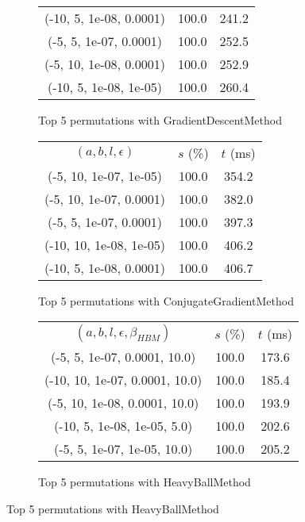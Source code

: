 \begin{figure}[H]
\begin{subfigure}[ht]{.5\textwidth}
\begin{tabular}{|c|c|c|}
(-10, 5, 1e-08, 0.0001) & 100.0 & 241.2 \\
(-5, 5, 1e-07, 0.0001) & 100.0 & 252.5 \\
(-5, 10, 1e-08, 0.0001) & 100.0 & 252.9 \\
(-10, 5, 1e-08, 1e-05) & 100.0 & 260.4 \\
\hline
\end{tabular}
\caption{Top 5 permutations with GradientDescentMethod}
\label{subfig:param_comp_MatrixSquareSum_GradientDescentMethod_DichotomousSearch}
\end{subfigure}
\hfill
\begin{subfigure}[ht]{.5\textwidth}
\begin{tabular}{|c|c|c|}
\hline
\rowcolor{gray!25}
\multicolumn{3}{|c|}{ConjugateGradientMethod} \\
\hline
\rowcolor{gray!25}
$(a,b,l,\epsilon)$ & $s$ (\%) & $t$ (ms) \\
\hline
(-5, 10, 1e-07, 1e-05) & 100.0 & 354.2 \\
(-5, 10, 1e-07, 0.0001) & 100.0 & 382.0 \\
(-5, 5, 1e-07, 0.0001) & 100.0 & 397.3 \\
(-10, 10, 1e-08, 1e-05) & 100.0 & 406.2 \\
(-10, 5, 1e-08, 0.0001) & 100.0 & 406.7 \\
\hline
\end{tabular}
\caption{Top 5 permutations with ConjugateGradientMethod}
\label{subfig:param_comp_MatrixSquareSum_ConjugateGradientMethod_DichotomousSearch}
\end{subfigure}
\hfill
\begin{subfigure}[ht]{.5\textwidth}
\begin{tabular}{|c|c|c|}
\hline
\rowcolor{gray!25}
\multicolumn{3}{|c|}{HeavyBallMethod} \\
\hline
\rowcolor{gray!25}
$(a,b,l,\epsilon,\beta_{HBM})$ & $s$ (\%) & $t$ (ms) \\
\hline
(-5, 5, 1e-07, 0.0001, 10.0) & 100.0 & 173.6 \\
(-10, 10, 1e-07, 0.0001, 10.0) & 100.0 & 185.4 \\
(-5, 10, 1e-08, 0.0001, 10.0) & 100.0 & 193.9 \\
(-10, 5, 1e-08, 1e-05, 5.0) & 100.0 & 202.6 \\
(-5, 5, 1e-07, 1e-05, 10.0) & 100.0 & 205.2 \\
\hline
\end{tabular}
\caption{Top 5 permutations with HeavyBallMethod}
\label{subfig:param_comp_MatrixSquareSum_HeavyBallMethod_DichotomousSearch}
\end{subfigure}
\end{figure}

